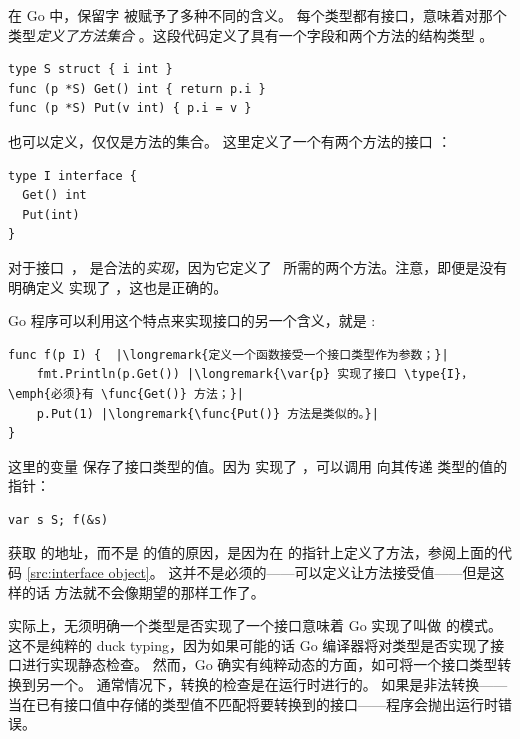 \noindent{}
在 Go 中，保留字  被赋予了多种不同的含义。
每个类型都有接口，意味着对那个类型\emph{定义了方法集合}
。这段代码定义了具有一个字段和两个方法的结构类型 。
\begin{lstlisting}[caption=定义结构和结构的方法,label=src:interface object]
type S struct { i int }
func (p *S) Get() int { return p.i }
func (p *S) Put(v int) { p.i = v }
\end{lstlisting}
也可以定义，仅仅是方法的集合。
这里定义了一个有两个方法的接口 ：
\begin{lstlisting}
type I interface {
  Get() int
  Put(int)
}
\end{lstlisting}

\noindent 对于接口~， 是合法的\emph{实现}，因为它定义了~
所需的两个方法。注意，即便是没有明确定义  实现了 ，这也是正确的。

Go 程序可以利用这个特点来实现接口的另一个含义，就是
:

\begin{lstlisting}
func f(p I) {  |\longremark{定义一个函数接受一个接口类型作为参数；}|
    fmt.Println(p.Get()) |\longremark{\var{p} 实现了接口 \type{I}，\emph{必须}有 \func{Get()} 方法；}|
    p.Put(1) |\longremark{\func{Put()} 方法是类似的。}|
}
\end{lstlisting}
\showremarks
这里的变量  保存了接口类型的值。因为
 实现了 ，可以调用  向其传递  类型的值的指针：
\begin{lstlisting}
var s S; f(&s)
\end{lstlisting}

获取  的地址，而不是  的值的原因，是因为在  
的指针上定义了方法，参阅上面的代码 \ref{src:interface object}。
这并不是必须的——可以定义让方法接受值——但是这样的话  方法就不会像期望的那样工作了。

实际上，无须明确一个类型是否实现了一个接口意味着 Go 实现了叫做
\cite{duck_typing} 的模式。
这不是纯粹的 duck typing，因为如果可能的话 Go 编译器将对类型是否实现了接口进行实现静态检查。
然而，Go 确实有纯粹动态的方面，如可将一个接口类型转换到另一个。
通常情况下，转换的检查是在运行时进行的。
如果是非法转换——当在已有接口值中存储的类型值不匹配将要转换到的接口——程序会抛出运行时错误。

